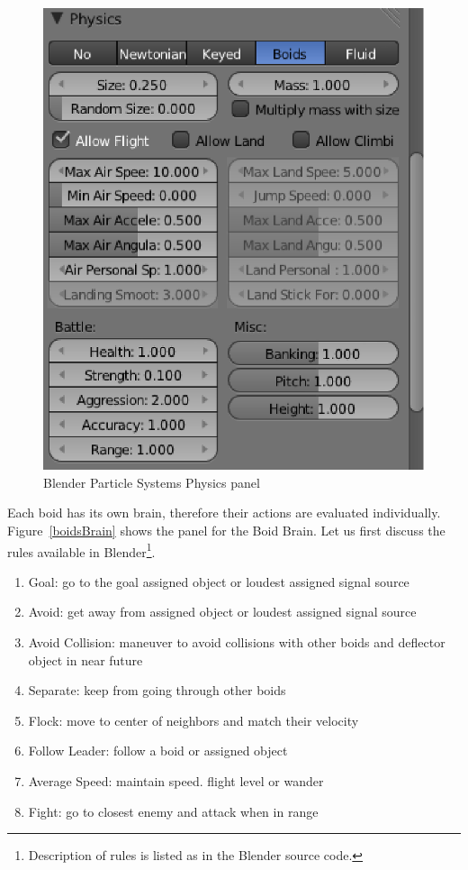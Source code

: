 \begin{figure}[htbp]
\begin{center}
\includegraphics[scale = 0.5]{figures/boidsPhysics.eps} 
\caption{Blender Particle Systems Physics panel}
\label{boidsPhysics}
\end{center}
\end{figure}

Each boid has its own brain, therefore their actions are evaluated individually. Figure~\ref{boidsBrain} shows the panel for the Boid Brain. Let us first discuss the rules available in Blender\footnote{Description of rules is listed as in the Blender source code.}.

\begin{enumerate}
\item{Goal: go to the goal assigned object or loudest assigned signal source}
\item{Avoid: get away from assigned object or loudest assigned signal source}
\item{Avoid Collision: maneuver to avoid collisions with other boids and deflector object in near future}
\item{Separate: keep from going through other boids}
\item{Flock: move to center of neighbors and match their velocity}
\item{Follow Leader: follow a boid or assigned object}
\item{Average Speed: maintain speed. flight level or wander}
\item{Fight: go to closest enemy and attack when in range}
\end{enumerate}


